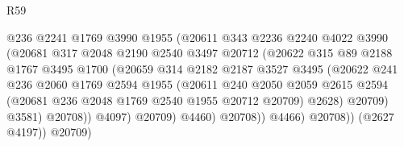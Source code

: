 \begin{lexlean}{R59}
\begin{coremodule}
                                  @236
                                  @2241
                                  @1769
                                  @3990
                                  @1955
                                  (@20611
                                    @343
                                    @2236
                                    @2240
                                    @4022
                                    @3990
                                    (@20681
                                      @317
                                      @2048
                                      @2190
                                      @2540
                                      @3497
                                      @20712
                                      (@20622
                                        @315
                                        @89
                                        @2188
                                        @1767
                                        @3495
                                        @1700
                                        (@20659
                                          @314
                                          @2182
                                          @2187
                                          @3527
                                          @3495
                                          (@20622
                                            @241
                                            @236
                                            @2060
                                            @1769
                                            @2594
                                            @1955
                                            (@20611
                                              @240
                                              @2050
                                              @2059
                                              @2615
                                              @2594
                                              (@20681 @236 @2048 @1769 @2540 @1955 @20712 @20709)
                                              @2628)
                                            @20709)
                                          @3581)
                                        @20708))
                                    @4097)
                                  @20709)
                                @4460)
                              @20708))
                          @4466)
                        @20708))
                    (@2627 @4197))
                  @20709)

\end{coremodule}
\end{lexlean}
